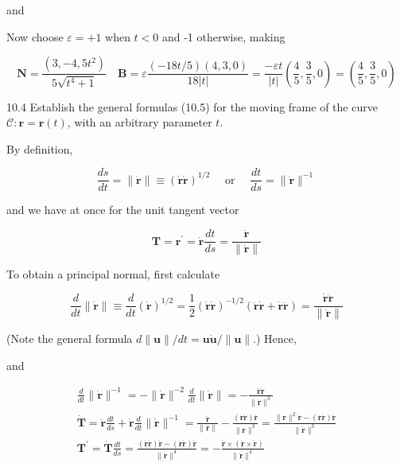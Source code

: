 \documentclass[10pt]{article}
\begin{document}
and

Now choose $\varepsilon=+1$ when $t<0$ and -1 otherwise, making

$$
\mathbf{N}=\frac{\left(3,-4,5 t^{2}\right)}{5 \sqrt{t^{4}+1}} \quad \mathbf{B}=\varepsilon \frac{(-18 t / 5)(4,3,0)}{18|t|}=\frac{-\varepsilon t}{|t|}\left(\frac{4}{5}, \frac{3}{5}, 0\right)=\left(\frac{4}{5}, \frac{3}{5}, 0\right)
$$

10.4 Establish the general formulas (10.5) for the moving frame of the curve $\mathscr{C}: \mathbf{r}=\mathbf{r}(t)$, with an arbitrary parameter $t$.

By definition,

$$
\frac{d s}{d t}=\|\dot{\mathbf{r}}\| \equiv(\dot{\mathbf{r}} \dot{\mathbf{r}})^{1 / 2} \quad \text { or } \quad \frac{d t}{d s}=\|\dot{\mathbf{r}}\|^{-1}
$$

and we have at once for the unit tangent vector

$$
\mathbf{T}=\mathbf{r}^{\prime}=\dot{\mathbf{r}} \frac{d t}{d s}=\frac{\dot{\mathbf{r}}}{\|\dot{\mathbf{r}}\|}
$$

To obtain a principal normal, first calculate

$$
\frac{d}{d t}\|\dot{\mathbf{r}}\| \equiv \frac{d}{d t}(\dot{\mathbf{r}})^{1 / 2}=\frac{1}{2}(\dot{\mathbf{r}} \dot{\mathbf{r}})^{-1 / 2}(\ddot{\mathbf{r}} \dot{\mathbf{r}}+\dot{\mathbf{r}} \ddot{\mathbf{r}})=\frac{\dot{\mathbf{r}} \ddot{\mathbf{r}}}{\|\dot{\mathbf{r}}\|}
$$

(Note the general formula $d\|\mathbf{u}\| / d t=\mathbf{u \dot { u }} /\|\mathbf{u}\|$.) Hence,

and

$$
\begin{gathered}
\frac{d}{d t}\|\dot{\mathbf{r}}\|^{-1}=-\|\dot{\mathbf{r}}\|^{-2} \frac{d}{d t}\|\dot{\mathbf{r}}\|=-\frac{\dot{\mathbf{r}} \ddot{\mathbf{r}}}{\|\dot{\mathbf{r}}\|^{3}} \\
\dot{\mathbf{T}}=\ddot{\mathbf{r}} \frac{d t}{d s}+\dot{\mathbf{r}} \frac{d}{d t}\|\dot{\mathbf{r}}\|^{-1}=\frac{\ddot{\mathbf{r}}}{\|\dot{\mathbf{r}}\|}-\frac{(\dot{\mathbf{r}} \ddot{\mathbf{r}}) \dot{\mathbf{r}}}{\|\dot{\mathbf{r}}\|^{3}}=\frac{\|\dot{\mathbf{r}}\|^{2} \ddot{\mathbf{r}}-(\dot{\mathbf{r}} \ddot{\mathbf{r}}) \dot{\mathbf{r}}}{\|\dot{\mathbf{r}}\|^{3}} \\
\mathbf{T}^{\prime}=\dot{\mathbf{T}} \frac{d t}{d s}=\frac{(\dot{\mathbf{r}} \dot{\mathbf{r}}) \ddot{\mathbf{r}}-(\dot{\mathbf{r}} \ddot{\mathbf{r}}) \dot{\mathbf{r}}}{\|\dot{\mathbf{r}}\|^{4}}=-\frac{\dot{\mathbf{r}} \times(\dot{\mathbf{r}} \times \ddot{\mathbf{r}})}{\|\dot{\mathbf{r}}\|^{4}}
\end{gathered}
$$
\end{document}
